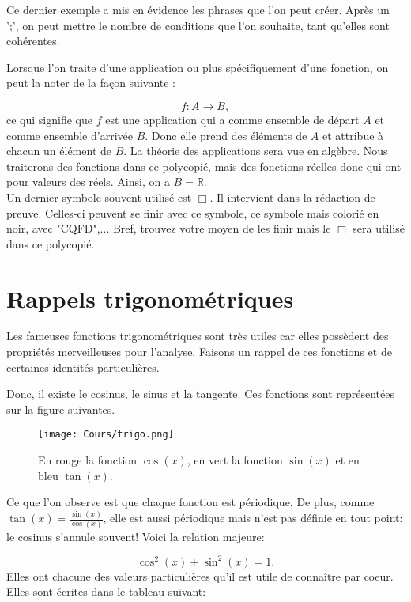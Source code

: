 \documentclass[oneside,12pt,french,table]{book}
\theoremstyle{definition}
\theoremstyle{plain}
\theoremstyle{remark}
\newcommand{\Rr}{{\mathbb{R}}}
\begin{document}
Ce dernier exemple a mis en évidence les phrases que l'on peut créer. Après un ';', on peut mettre le nombre de conditions que l'on souhaite, tant qu'elles sont cohérentes. 

Lorsque l'on traite d'une application ou plus spécifiquement d'une fonction, on peut la noter de la façon suivante :

\begin{equation}
    f: A \to B,
\end{equation}
ce qui signifie que $f$ est une application qui a comme ensemble de départ $A$ et comme ensemble d'arrivée $B$. Donc elle prend des éléments de $A$ et attribue à chacun un élément de $B$. La théorie des applications sera vue en algèbre. Nous traiterons des fonctions dans ce polycopié, mais des fonctions réelles donc qui ont pour valeurs des réels. Ainsi, on a $B=\Rr$.\\

Un dernier symbole souvent utilisé est $\Box$. Il intervient dans la rédaction de preuve. Celles-ci peuvent se finir avec ce symbole, ce symbole mais colorié en noir, avec "CQFD",... Bref, trouvez votre moyen de les finir mais le $\Box$ sera utilisé dans ce polycopié.

\section{Rappels trigonométriques}

Les fameuses fonctions trigonométriques sont très utiles car elles possèdent des propriétés merveilleuses pour l'analyse. Faisons un rappel de ces fonctions et de certaines identités particulières. 

Donc, il existe le cosinus, le sinus et la tangente. Ces fonctions sont représentées sur la figure suivantes.

\begin{figure}[H]
    \centering
    \texttt{[image: Cours/trigo.png]}
    \caption{En rouge la fonction $\cos(x)$, en vert la fonction $\sin(x)$ et en bleu $\tan(x)$.}
    \label{fig:Cours/trigo.png}
\end{figure}
Ce que l'on observe est que chaque fonction est périodique. De plus, comme $\tan(x)=\frac{\sin(x)}{\cos(x)}$, elle est aussi périodique mais n'est pas définie en tout point: le cosinus s'annule souvent!
Voici la relation majeure:

\begin{equation}
    \cos^2(x)+\sin^2(x)=1.
\end{equation}
Elles ont chacune des valeurs particulières qu'il est utile de connaître par coeur. Elles sont écrites dans le tableau suivant:
\end{document}
